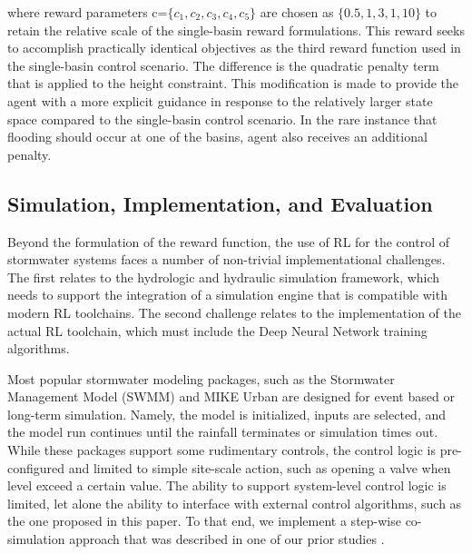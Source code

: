 where reward parameters  c=$\{c_1,c_2,c_3,c_4,c_5\}$ are chosen as $\{0.5,1,3,1,10\}$ to retain the relative scale of the single-basin reward formulations.
This reward seeks to accomplish practically identical objectives as the third reward function used in the single-basin control scenario.
The difference is the quadratic penalty term that is applied to the height constraint.
This modification is made to provide the agent with a more explicit guidance in response to the relatively larger state space compared to the single-basin control scenario.
In the rare instance that flooding should occur at one of the basins, agent also receives an additional penalty.

\subsection{Simulation, Implementation, and Evaluation}
Beyond the formulation of the reward function, the use of RL for the control of stormwater systems faces a number of non-trivial implementational challenges.
The first relates to the hydrologic and hydraulic simulation framework, which needs to support the integration of a simulation engine that is compatible with modern RL toolchains.
The second challenge relates to the implementation of the actual RL toolchain, which must include the Deep Neural Network training algorithms.

Most popular stormwater modeling packages, such as the Stormwater Management Model (SWMM) \cite{Rossman2010Storm5.1} and MIKE Urban \cite{Elliott2007ADrainage} are designed for event based or long-term simulation.
Namely, the model is initialized, inputs are selected, and the model run continues until the rainfall terminates or simulation times out.
While these packages support some rudimentary controls, the control logic is pre-configured and limited to simple site-scale action, such as opening a valve when level exceed a certain value.
The ability to support system-level control logic is limited, let alone the ability to interface with external control algorithms, such as the one proposed in this paper.
To that end, we implement a step-wise co-simulation approach that was described in one of our prior studies \cite{Mullapudi2017}.

